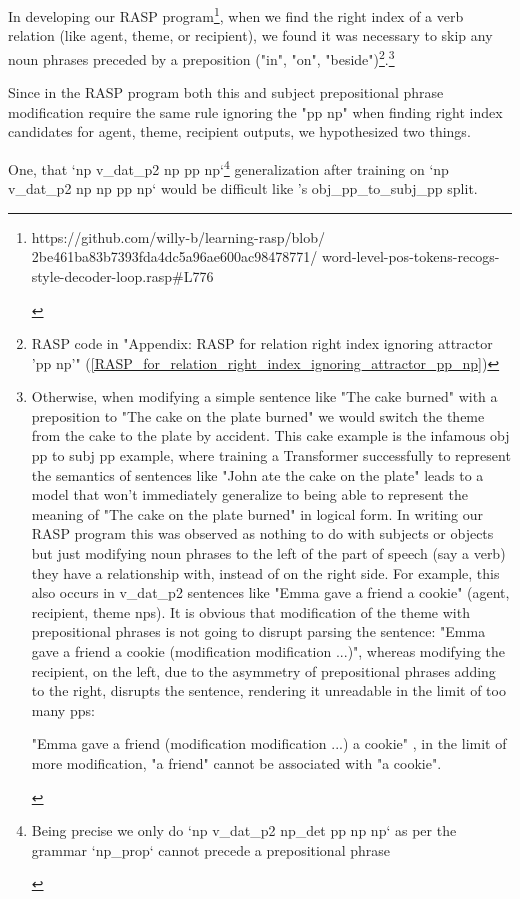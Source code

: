 \documentclass[11pt]{article}
\begin{document}
In developing our RASP program\footnote{\begin{footnotesize}https://github.com/willy-b/learning-rasp/blob/
2be461ba83b7393fda4dc5a96ae600ac98478771/
word-level-pos-tokens-recogs-style-decoder-loop.rasp\#L776
\end{footnotesize}
},
when we find the right index of a verb relation (like agent, theme, or recipient), 
we found it was necessary to skip any noun phrases preceded by a preposition ("in", "on", "beside")\footnote{RASP code in "Appendix: RASP for relation right index ignoring attractor 'pp np'" (\ref{RASP_for_relation_right_index_ignoring_attractor_pp_np})}.\footnote{\begin{footnotesize}Otherwise, when modifying a simple sentence like "The cake burned" with a preposition to "The cake on the plate burned" we would switch the theme from the cake to the plate by accident.
This cake example is the infamous obj pp to subj pp example, where training a Transformer successfully to represent the semantics of sentences like "John ate the cake on the plate" leads to a model that won't immediately generalize to being able to represent the meaning of "The cake on the plate burned" in logical form.
In writing our RASP program this was observed as nothing to do with subjects or objects but just modifying noun phrases to the left of the part of speech (say a verb) they have a relationship with, instead of on the right side. For example, this also occurs in v\_dat\_p2 sentences like "Emma gave a friend a cookie" (agent, recipient, theme nps). It is obvious that modification of the theme with prepositional phrases is not going to disrupt parsing the sentence: "Emma gave a friend a cookie (modification modification ...)", whereas modifying the recipient, on the left, due to the asymmetry of prepositional phrases adding to the right, disrupts the sentence, rendering it unreadable in the limit of too many pps:

"Emma gave a friend (modification modification ...) a cookie" , in the limit of more modification, "a friend" cannot be associated with "a cookie".
\end{footnotesize}}

Since in the RASP program both this and subject prepositional phrase modification require the same rule ignoring the "pp np" when finding right index candidates for agent, theme, recipient outputs, we hypothesized two things.

One, that `np v\_dat\_p2 np pp np`\footnote{\begin{footnotesize}Being precise we only do `np v\_dat\_p2 np\_det pp np np` as per the grammar `np\_prop` cannot precede a prepositional phrase\end{footnotesize}} generalization after training on `np v\_dat\_p2 np np pp np` would be difficult like \cite{Wu2023}'s obj\_pp\_to\_subj\_pp split.
\end{document}
